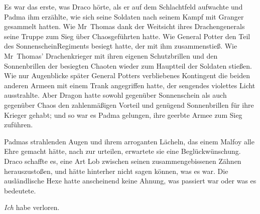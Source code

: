 Es war das erste, was Draco hörte, als er auf dem Schlachtfeld aufwachte und Padma ihm erzählte, wie sich seine Soldaten nach seinem Kampf mit Granger gesammelt hatten. Wie Mr~Thomas dank der Weitsicht ihres Drachengenerals seine Truppe zum Sieg über Chaosgeführten hatte.
Wie General Potter den Teil des SonnenscheinRegiments besiegt hatte, der mit ihm zusammenstieß. Wie Mr~Thomas' Drachenkrieger mit ihren eigenen Schutzbrillen und den Sonnenbrillen der besiegten Chaoten wieder zum Hauptteil der Soldaten stießen. Wie nur Augenblicke später General Potters verbliebenes Kontingent die beiden anderen Armeen mit einem Trank angegriffen hatte, der sengendes violettes Licht ausstrahlte. Aber Dragon hatte sowohl gegenüber Sonnenschein als auch gegenüber Chaos den zahlenmäßigen Vorteil und genügend Sonnenbrillen für ihre Krieger gehabt; und so war es Padma gelungen, ihre geerbte Armee zum Sieg zuführen.

Padmas strahlenden Augen und ihrem arroganten Lächeln, das einem Malfoy alle Ehre gemacht hätte, nach zur urteilen, erwartete sie eine Beglückwünschung. Draco schaffte es, eine Art Lob zwischen seinen zusammengebissenen Zähnen herauszustoßen, und hätte hinterher nicht sagen können, was es war. Die ausländlische Hexe hatte anscheinend keine Ahnung, was passiert war oder was es bedeutete.

\emph{Ich} habe verloren.

